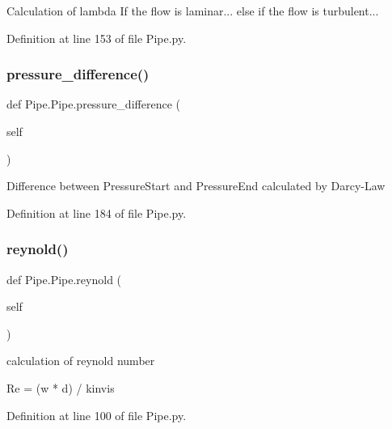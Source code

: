 \begin{DoxyVerb}Calculation of lambda
If the flow is laminar...
else if the flow is turbulent...
\end{DoxyVerb}
 

Definition at line 153 of file Pipe.\+py.

\mbox{\label{class_pipe_1_1_pipe_a69d6c5c5204633f84cc45801adf17aed}} 
\subsubsection{\texorpdfstring{pressure\+\_\+difference()}{pressure\_difference()}}
{\footnotesize\ttfamily def Pipe.\+Pipe.\+pressure\+\_\+difference (\begin{DoxyParamCaption}\item[{}]{self }\end{DoxyParamCaption})}

\begin{DoxyVerb}Difference between PressureStart and PressureEnd
calculated by Darcy-Law
\end{DoxyVerb}
 

Definition at line 184 of file Pipe.\+py.

\mbox{\label{class_pipe_1_1_pipe_afec35167b5ad4acf26ea2db36292d135}} 
\subsubsection{\texorpdfstring{reynold()}{reynold()}}
{\footnotesize\ttfamily def Pipe.\+Pipe.\+reynold (\begin{DoxyParamCaption}\item[{}]{self }\end{DoxyParamCaption})}

\begin{DoxyVerb}calculation of reynold number

Re = (w * d) / kinvis
\end{DoxyVerb}
 

Definition at line 100 of file Pipe.\+py.

\mbox{\label{class_pipe_1_1_pipe_a628661bc972aee1bc2f84623fcfaed91}} 
